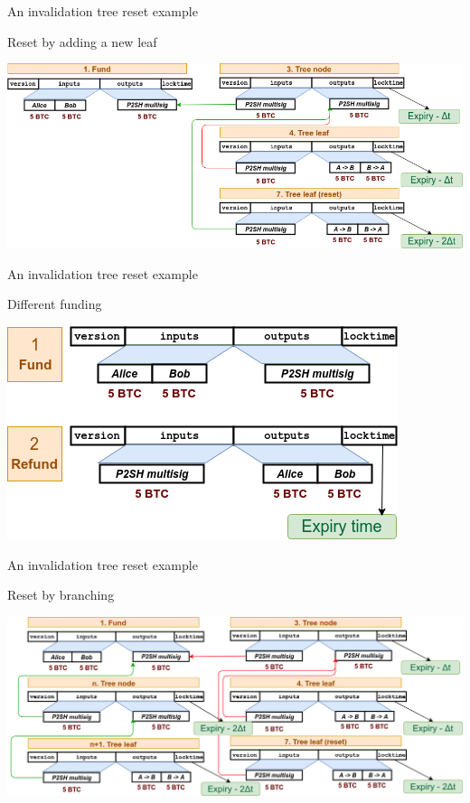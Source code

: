 \documentclass{beamer}
\begin{document}
\begin{frame}{An invalidation tree reset example}
 \begin{exampleblock}{Reset by adding a new leaf}
  \begin{center}
   \includegraphics[width=\textwidth, height=0.8\textheight, keepaspectratio]{img/bidir_tree.png}
  \end{center}
 \end{exampleblock}
\end{frame}
\begin{frame}{An invalidation tree reset example}
 \begin{exampleblock}{Different funding}
  \begin{center}
   \includegraphics[width=\textwidth, height=0.8\textheight, keepaspectratio]{img/bidir_tree_fund.png}
  \end{center}
 \end{exampleblock}
\end{frame}
\begin{frame}{An invalidation tree reset example}
 \begin{exampleblock}{Reset by branching}
  \begin{center}
   \includegraphics[width=\textwidth, height=0.8\textheight, keepaspectratio]{img/bidir_tree_expanded.png}
  \end{center}
 \end{exampleblock}
\end{frame}
\end{document}
